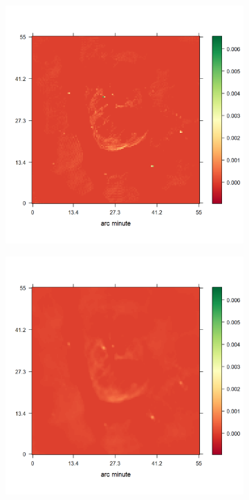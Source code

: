 \begin{figure}[h!]
	\begin{subfigure}[b]{0.32\linewidth}
		\includegraphics[width=\linewidth, trim={20px 50px 75px 52px}, clip]{./chapters/05.results/g55/L1_model.png}
	\end{subfigure}
	\begin{subfigure}[b]{0.32\linewidth}
		\vspace{10pt}
		\includegraphics[width=\linewidth, trim={20px 50px 75px 52px}, clip]{./chapters/05.results/g55/L2_model.png}

\end{subfigure}
\end{figure}
